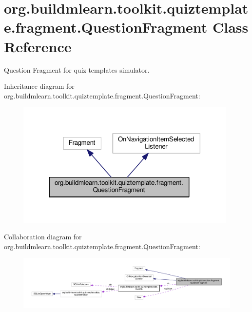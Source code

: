 \hypertarget{classorg_1_1buildmlearn_1_1toolkit_1_1quiztemplate_1_1fragment_1_1QuestionFragment}{}\section{org.\+buildmlearn.\+toolkit.\+quiztemplate.\+fragment.\+Question\+Fragment Class Reference}
\label{classorg_1_1buildmlearn_1_1toolkit_1_1quiztemplate_1_1fragment_1_1QuestionFragment}


Question Fragment for quiz template\textquotesingle{}s simulator.  




Inheritance diagram for org.\+buildmlearn.\+toolkit.\+quiztemplate.\+fragment.\+Question\+Fragment\+:
\nopagebreak
\begin{figure}[H]
\begin{center}
\leavevmode
\includegraphics[width=312pt]{classorg_1_1buildmlearn_1_1toolkit_1_1quiztemplate_1_1fragment_1_1QuestionFragment__inherit__graph}
\end{center}
\end{figure}


Collaboration diagram for org.\+buildmlearn.\+toolkit.\+quiztemplate.\+fragment.\+Question\+Fragment\+:
\nopagebreak
\begin{figure}[H]
\begin{center}
\leavevmode
\includegraphics[width=350pt]{classorg_1_1buildmlearn_1_1toolkit_1_1quiztemplate_1_1fragment_1_1QuestionFragment__coll__graph}
\end{center}
\end{figure}
